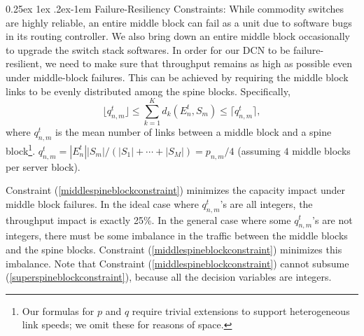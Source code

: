 \documentclass[letterpaper,twocolumn,10pt]{article}
\makeatletter
\renewcommand{\paragraph}{%
  \@startsection{paragraph}{4}%
  {\z@}{0.25ex \@plus 1ex \@minus .2ex}{-1em}%
  {\normalfont\normalsize\bfseries}%
}
\makeatother
\begin{document}
\paragraph{Failure-Resiliency Constraints:}
While commodity switches are highly reliable, an entire middle block can fail as a unit due to software bugs in its routing controller. We also bring down an entire middle block occasionally to upgrade the switch stack softwares. In order for our DCN to be failure-resilient, we need to make sure that throughput remains as high as possible even under middle-block failures. This can be achieved by requiring the middle block links to be evenly distributed among the spine blocks. Specifically,
\begin{equation}\label{middlespineblockconstraint}
\lfloor q^t_{n,m}\rfloor\leq \sum_{k=1}^K d_k(E_n^t, S_m)\leq \lceil q^t_{n,m}\rceil,
\end{equation}
where $q^t_{n,m}$ is the mean number of links between a middle block and a spine block\footnote{Our formulas for $p$ and $q$ require trivial extensions to support heterogeneous link speeds; we omit these for reasons of space.}.
$q^t_{n,m}=|E^t_n||S_m|/(|S_1|+\cdots+|S_M|)=p_{n,m}/4$ (assuming $4$ middle blocks per server block).

Constraint (\ref{middlespineblockconstraint}) minimizes the capacity impact under middle block failures. In the ideal case where $q^t_{n,m}$'s are all integers, the throughput impact is exactly 25\%. In the general case where some $q^t_{n,m}$'s are not integers, there must be some imbalance in the traffic between the middle blocks and the spine blocks. Constraint (\ref{middlespineblockconstraint}) minimizes this imbalance. Note that Constraint (\ref{middlespineblockconstraint}) cannot subsume (\ref{superspineblockconstraint}), because all the decision variables are integers.

\end{document}
